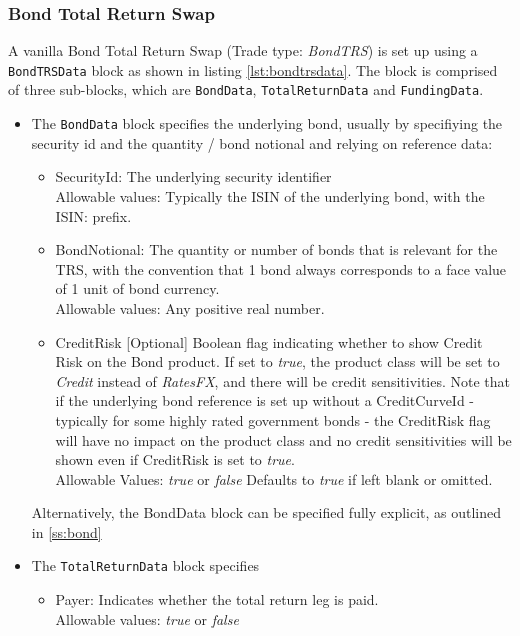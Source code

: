 \subsubsection{Bond Total Return Swap}
\label{ss:TRS}

A vanilla Bond Total Return Swap (Trade type: \emph{BondTRS}) is set up using a {\tt BondTRSData} block as shown in listing \ref{lst:bondtrsdata}. The block is comprised of three sub-blocks, which
are {\tt BondData}, {\tt TotalReturnData} and {\tt FundingData}.

\begin{itemize}
\item The {\tt BondData} block specifies the underlying bond, usually by specifiying the security id and the quantity /
  bond notional and relying on reference data:

  \begin{itemize}
  \item SecurityId: The underlying security identifier\\
      Allowable values: Typically the ISIN of the underlying bond, with the ISIN: prefix.
  \item BondNotional: The quantity or number of bonds that is relevant for the TRS, with the convention that 1 bond always corresponds to a face value of 1 unit of bond currency.\\
      Allowable values: Any positive real number.
  \item CreditRisk [Optional] Boolean flag indicating whether to show Credit Risk on the Bond product. If set to \emph{true}, the product class will be set to \emph{Credit} instead of \emph{RatesFX}, and there will be credit sensitivities. Note that if the underlying bond reference is set up without a CreditCurveId - typically for some highly rated government bonds -  the CreditRisk flag will have no impact on the product class and no credit sensitivities will be shown even if CreditRisk is set to \emph{true}. \\
      Allowable Values: \emph{true} or \emph{false} Defaults to \emph{true} if left blank or omitted.          
  \end{itemize}

  Alternatively, the BondData block can be specified fully explicit, as outlined in \ref{ss:bond}

\item The {\tt TotalReturnData} block specifies
  \begin{itemize}
  \item Payer: Indicates whether the total return leg is paid.\\
    Allowable values: \emph{true} or \emph{false}


\end{itemize}
\end{itemize}
